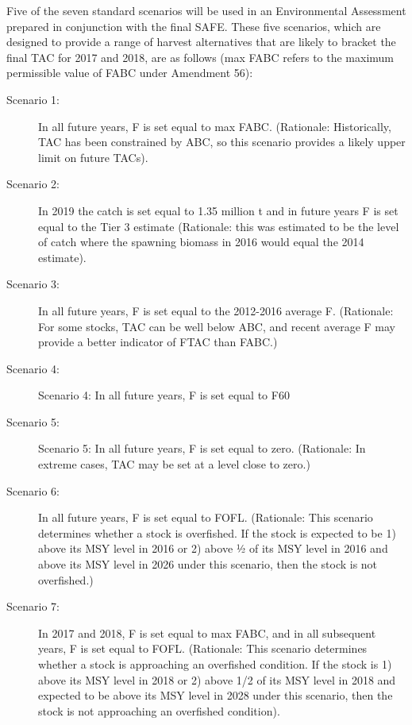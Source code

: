 Five of the seven standard scenarios will be used in an Environmental
Assessment prepared in conjunction with the final SAFE. These five
scenarios, which are designed to provide a range of harvest alternatives
that are likely to bracket the final TAC for 2017 and 2018, are as
follows (max FABC refers to the maximum permissible value of FABC under
Amendment 56):

\begin{description}
\item[Scenario 1:]   
In all future years, F is set equal to max FABC. (Rationale:  Historically, TAC has been constrained by ABC, so this scenario provides a likely upper limit on future TACs).
\item[Scenario 2:]   
In 2019 the catch is set equal to 1.35 million t and in future years F is set equal to the Tier 3 estimate (Rationale: this was estimated to be the level of catch where the spawning biomass in 2016 would equal the 2014 estimate). 
\item[Scenario 3:]   
In all future years, F is set equal to the 2012-2016 average F. (Rationale:  For some stocks, TAC can be well below ABC, and recent average F may provide a better indicator of FTAC than FABC.)
\item[Scenario 4:]   
Scenario 4: In all future years, F is set equal to F60%
\item[Scenario 5:]   
Scenario 5: In all future years, F is set equal to zero. (Rationale:  In extreme cases, TAC may be set at a level close to zero.)
\item[Scenario 6:]   
In all future years, F is set equal to FOFL. (Rationale:  This scenario determines whether a stock is overfished. If the stock is expected to be 1) above its MSY level in 2016 or 2) above ½ of its MSY level in 2016 and above its MSY level in 2026 under this scenario, then the stock is not overfished.)
\item[Scenario 7:]   
In 2017 and 2018, F is set equal to max FABC, and in all subsequent years, F is set equal to FOFL. (Rationale:  This scenario determines whether a stock is approaching an overfished condition. If the stock is 1) above its MSY level in 2018 or 2) above 1/2 of its MSY level in 2018 and expected to be above its MSY level in 2028 under this scenario, then the stock is not approaching an overfished condition). 
\end{description}

